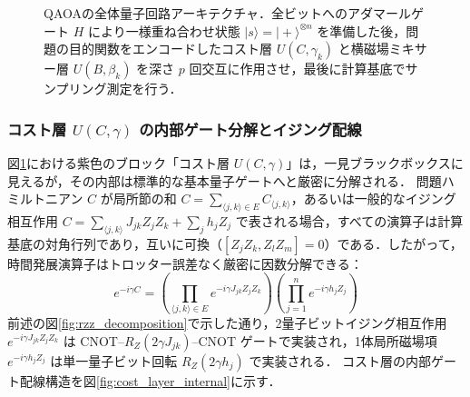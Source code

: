 \documentclass[11pt,a4paper,oneside,openany]{ltjsbook}
\theoremstyle{definition}
\theoremstyle{plain}
\theoremstyle{remark}
\newcommand{\ket}[1]{|#1\rangle}
\begin{document}
\begin{figure}[htbp]
\caption{QAOAの全体量子回路アーキテクチャ．全ビットへのアダマールゲート $H$ により一様重ね合わせ状態 $\ket{s} = \ket{+}^{\otimes n}$ を準備した後，問題の目的関数をエンコードしたコスト層 $U(C, \gamma_k)$ と横磁場ミキサー層 $U(B, \beta_k)$ を深さ $p$ 回交互に作用させ，最後に計算基底でサンプリング測定を行う．}
\label{fig:qaoa_circuit_diagram}
\end{figure}

\subsubsection{コスト層 $U(C, \gamma)$ の内部ゲート分解とイジング配線}
図\ref{fig:qaoa_circuit_diagram}における紫色のブロック「コスト層 $U(C, \gamma)$」は，一見ブラックボックスに見えるが，その内部は標準的な基本量子ゲートへと厳密に分解される．
問題ハミルトニアン $C$ が局所節の和 $C = \sum_{\langle j, k \rangle \in E} C_{\langle j, k \rangle}$，あるいは一般的なイジング相互作用 $C = \sum_{\langle j, k \rangle} J_{jk} Z_j Z_k + \sum_j h_j Z_j$ で表される場合，すべての演算子は計算基底の対角行列であり，互いに可換（$[Z_j Z_k, Z_l Z_m] = 0$）である．したがって，時間発展演算子はトロッター誤差なく厳密に因数分解できる：
\begin{equation}
    e^{-i \gamma C} = \left( \prod_{\langle j, k \rangle \in E} e^{-i \gamma J_{jk} Z_j Z_k} \right) \left( \prod_{j=1}^n e^{-i \gamma h_j Z_j} \right)
\end{equation}
前述の図\ref{fig:rzz_decomposition}で示した通り，2量子ビットイジング相互作用 $e^{-i \gamma J_{jk} Z_j Z_k}$ は CNOT--$R_Z(2\gamma J_{jk})$--CNOT ゲートで実装され，1体局所磁場項 $e^{-i \gamma h_j Z_j}$ は単一量子ビット回転 $R_Z(2\gamma h_j)$ で実装される．
コスト層の内部ゲート配線構造を図\ref{fig:cost_layer_internal}に示す．
\end{document}
